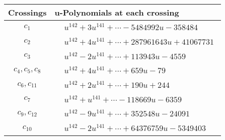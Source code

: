 \documentclass[1p]{elsarticle_modified}
\theoremstyle{definition}
\begin{document}
\begin{tabular}{m{50pt}|m{274pt}}
Crossings & \hspace{64pt}u-Polynomials at each crossing \\
\hline $$\begin{aligned}c_{1}\end{aligned}$$&$\begin{aligned}
&u^{142}+3 u^{141}+\cdots-5484992 u-358484
\end{aligned}$\\
\hline $$\begin{aligned}c_{2}\end{aligned}$$&$\begin{aligned}
&u^{142}+4 u^{141}+\cdots+287961643 u+41067731
\end{aligned}$\\
\hline $$\begin{aligned}c_{3}\end{aligned}$$&$\begin{aligned}
&u^{142}-2 u^{141}+\cdots+113943 u-4559
\end{aligned}$\\
\hline $$\begin{aligned}c_{4},c_{5},c_{8}\end{aligned}$$&$\begin{aligned}
&u^{142}+4 u^{141}+\cdots+659 u-79
\end{aligned}$\\
\hline $$\begin{aligned}c_{6},c_{11}\end{aligned}$$&$\begin{aligned}
&u^{142}+2 u^{141}+\cdots+190 u+244
\end{aligned}$\\
\hline $$\begin{aligned}c_{7}\end{aligned}$$&$\begin{aligned}
&u^{142}+u^{141}+\cdots-118669 u-6359
\end{aligned}$\\
\hline $$\begin{aligned}c_{9},c_{12}\end{aligned}$$&$\begin{aligned}
&u^{142}-9 u^{141}+\cdots+352548 u-24091
\end{aligned}$\\
\hline $$\begin{aligned}c_{10}\end{aligned}$$&$\begin{aligned}
&u^{142}-2 u^{141}+\cdots+64376759 u-5349403
\end{aligned}$\\
\hline
\end{tabular}\\~\\
\end{document}
